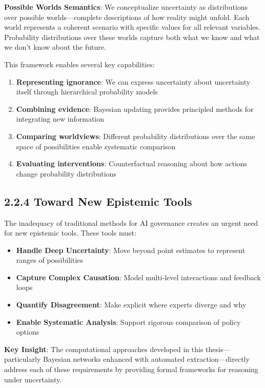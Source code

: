 \documentclass[
  11pt,
  letterpaper,
  openany]{book}
\providecommand{\tightlist}{%
  \setlength{\itemsep}{0pt}\setlength{\parskip}{0pt}}
\begin{document}
\textbf{Possible Worlds Semantics}: We conceptualize uncertainty as
distributions over possible worlds---complete descriptions of how
reality might unfold. Each world represents a coherent scenario with
specific values for all relevant variables. Probability distributions
over these worlds capture both what we know and what we don't know about
the future.

This framework enables several key capabilities:

\begin{enumerate}
\def\labelenumi{\arabic{enumi}.}
\tightlist
\item
  \textbf{Representing ignorance}: We can express uncertainty about
  uncertainty itself through hierarchical probability models
\item
  \textbf{Combining evidence}: Bayesian updating provides principled
  methods for integrating new information
\item
  \textbf{Comparing worldviews}: Different probability distributions
  over the same space of possibilities enable systematic comparison
\item
  \textbf{Evaluating interventions}: Counterfactual reasoning about how
  actions change probability distributions
\end{enumerate}

\subsection{2.2.4 Toward New Epistemic
Tools}\label{toward-new-epistemic-tools}

The inadequacy of traditional methods for AI governance creates an
urgent need for new epistemic tools. These tools must:

\begin{itemize}
\tightlist
\item
  \textbf{Handle Deep Uncertainty}: Move beyond point estimates to
  represent ranges of possibilities
\item
  \textbf{Capture Complex Causation}: Model multi-level interactions and
  feedback loops
\item
  \textbf{Quantify Disagreement}: Make explicit where experts diverge
  and why
\item
  \textbf{Enable Systematic Analysis}: Support rigorous comparison of
  policy options
\end{itemize}

\textbf{Key Insight}: The computational approaches developed in this
thesis---particularly Bayesian networks enhanced with automated
extraction---directly address each of these requirements by providing
formal frameworks for reasoning under uncertainty.
\end{document}
